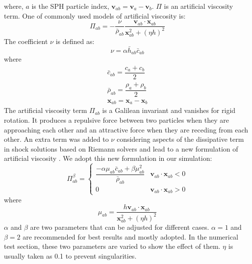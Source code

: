 \documentclass[review]{elsarticle}
\begin{document}
where, $a$ is the SPH particle index, $\textbf{v}_{a b} = \textbf{v}_a - \textbf{v}_b$. $\Pi$ is an artificial viscosity term.
One of commonly used models of artificial viscosity \citep{monaghan1983shock} is:
\begin{equation}
\Pi_{ab}=- \frac{\nu}{\bar{\rho}_{ab}} \dfrac{ \textbf{v}_{ab} \cdot \textbf{x}_{ab}}{\textbf{x}_{ab}^2 + \left(\eta h\right)^2}
\label{eq:art-vis-original}
\end{equation}
The coefficient $\nu$ is defined as:
\begin{equation}
\nu = \alpha \bar{h}_{ab} \bar{c}_{ab}
\end{equation}
where 
\begin{align}
\bar{c}_{ab} = \dfrac{c_a + c_b}{2} \\
\bar{\rho}_{ab} = \dfrac{\rho_a + \rho_b}{2} \\
\textbf{x}_{ab}=\textbf{x}_a-\textbf{x}_b
\end{align}
The artificial viscosity term $\Pi_{ab}$ is a Galilean invariant and vanishes for rigid rotation. It produces a repulsive force between two particles when they are approaching each other and an attractive force when they are receding from each other.
An extra term was added to $\nu$ considering aspects of the dissipative term in shock solutions based on Riemann solvers and lead to a new formulation of artificial viscosity \citep{monaghan1992smoothed}. We adopt this new formulation in our simulation:
\begin{equation}
\Pi_{ab}^{\beta} = 
\begin{cases} 
      \dfrac{- \alpha \mu_{ab} \bar{c}_{ab} + \beta \mu_{ab}^2} {\bar{\rho}_{ab}} & \textbf{v}_{ab} \cdot \textbf{x}_{ab} < 0\\
      0 & \textbf{v}_{ab} \cdot \textbf{x}_{ab} > 0
\end{cases}
\label{eq:art-vis-shock}
\end{equation}
where
\begin{equation}
\mu_{ab} = \dfrac{h \textbf{v}_{ab} \cdot \textbf{x}_{ab}}{\textbf{x}_{ab}^2 + \left(\eta h\right)^2} 
\end{equation}
$\alpha$ and $\beta$ are two parameters that can be adjusted for different cases.
$\alpha = 1$ and $\beta = 2$ are recommended \citep{monaghan2005smoothed} for best results and mostly adopted. In the numerical test section, these two parameters are varied to show the effect of them. $\eta$ is usually taken as 0.1 to prevent singularities.
\end{document}
